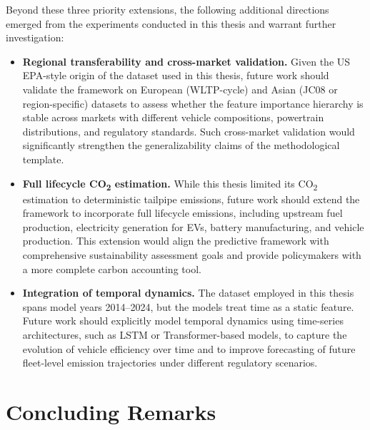 Beyond these three priority extensions, the following additional directions emerged from the experiments conducted in this thesis and warrant further investigation:

\begin{itemize}
    \item \textbf{Regional transferability and cross-market validation.} Given the US EPA-style origin of the dataset used in this thesis, future work should validate the framework on European (WLTP-cycle) and Asian (JC08 or region-specific) datasets to assess whether the feature importance hierarchy is stable across markets with different vehicle compositions, powertrain distributions, and regulatory standards. Such cross-market validation would significantly strengthen the generalizability claims of the methodological template.

    \item \textbf{Full lifecycle CO\textsubscript{2} estimation.} While this thesis limited its CO\textsubscript{2} estimation to deterministic tailpipe emissions, future work should extend the framework to incorporate full lifecycle emissions, including upstream fuel production, electricity generation for EVs, battery manufacturing, and vehicle production. This extension would align the predictive framework with comprehensive sustainability assessment goals and provide policymakers with a more complete carbon accounting tool.

    \item \textbf{Integration of temporal dynamics.} The dataset employed in this thesis spans model years 2014--2024, but the models treat time as a static feature. Future work should explicitly model temporal dynamics using time-series architectures, such as LSTM or Transformer-based models, to capture the evolution of vehicle efficiency over time and to improve forecasting of future fleet-level emission trajectories under different regulatory scenarios.
\end{itemize}



\section{Concluding Remarks}

